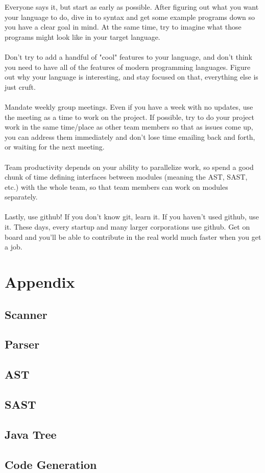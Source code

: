 \documentclass[oneside]{book}
\begin{document}
Everyone says it, but start as early as possible. After figuring out what you want your language to do, dive in to syntax and get some example programs down so you have a clear goal in mind. At the same time, try to imagine what those programs might look like in your target language.\\\\
Don't try to add a handful of "cool" features to your language, and don't think you need to have all of the features of modern programming languages. Figure out why your language is interesting, and stay focused on that, everything else is just cruft.\\\\
Mandate weekly group meetings. Even if you have a week with no updates, use the meeting as a time to work on the project. If possible, try to do your project work in the same time/place as other team members so that as issues come up, you can address them immediately and don't lose time emailing back and forth, or waiting for the next meeting.\\\\
Team productivity depends on your ability to parallelize work, so spend a good chunk of time defining interfaces between modules (meaning the AST, SAST, etc.) with the whole team, so that team members can work on modules separately.\\\\
Lastly, use github! If you don't know git, learn it. If you haven't used github, use it. These days, every startup and many larger corporations use github. Get on board and you'll be able to contribute in the real world much faster when you get a job.


\chapter{Appendix}

\section{Scanner}

\section{Parser}

\section{AST}

\section{SAST}

\section{Java Tree}

\section{Code Generation}
\end{document}

